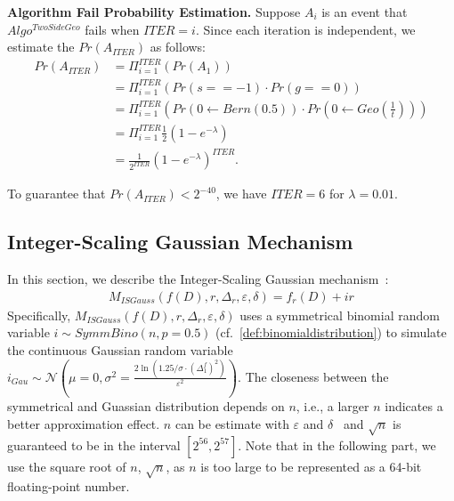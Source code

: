 \textbf{Algorithm Fail Probability Estimation. }
Suppose $A_i$ is an event that $Algo^{TwoSideGeo}$ fails when $ITER=i$.
Since each iteration is independent, we estimate the $Pr\left(A_{ITER}\right)$ as follows:
\begin{equation}
    \begin{split}
        Pr\left(A_{ITER}\right) & = \Pi _{i=1}^{ITER}\left(Pr\left(A_1\right) \right) \\
        &= \Pi _{i=1}^{ITER} \left(Pr\left(s==-1\right)\cdot  Pr\left(g==0\right) \right)\\
        &=       \Pi _{i=1}^{ITER} \left(Pr\left(0\gets Bern\left(0.5\right) \right)\cdot Pr\left(0\gets Geo\left(\frac{1}{t}\right) \right)  \right)                   \\
        &= \Pi _{i=1}^{ITER} \frac{1}{2}  \left(1-e^{-\lambda}\right) \\
        &= \frac{1}{2^{ITER}}  \left(1-e^{-\lambda}\right)^{ITER}.
    \end{split}
\end{equation}

To guarantee that $Pr\left(A_{ITER}\right)<2^{-40}$, we have $ITER = 6$ for $\lambda = 0.01$.




\subsection{Integer-Scaling Gaussian Mechanism}
\label{subsec:IntegerScalingGaussianMechanism}
In this section, we describe the Integer-Scaling Gaussian mechanism~\cite{googleDP2019}:
\begin{equation}
    \begin{split}
        M_{ISGauss}\left(f\left(D\right),r,\Delta_r,\varepsilon,\delta\right)=f_r\left(D\right) +ir
    \end{split}
\end{equation}
Specifically, $M_{ISGauss}\left(f\left(D\right),r,\Delta_r,\varepsilon,\delta\right)$ uses a symmetrical binomial random variable $i\sim SymmBino\left(n,p=0.5\right) $ (cf.~\autoref{def:binomialdistribution}) to simulate the continuous Gaussian random variable $i_{Gau}\sim \mathcal{N} \left(\mu=0,\sigma^2=\frac{2 \ln\left(1.25/\sigma \cdot \left(\Delta_1^f\right)^2 \right) }{\varepsilon^2}\right) $. The closeness between the symmetrical and Guassian distribution depends on $n$, i.e., a larger $n$ indicates a better approximation effect. $n$ can be estimate with $\varepsilon$ and $\delta$~\cite{ImproveGaussianMechanism} and $\sqrt{n} $ is guaranteed to be in the interval $\left[2^{56},2^{57}\right] $. Note that in the following part, we use the square root of $n$, $\sqrt{n}$, as $n$ is too large to be represented as a 64-bit floating-point number.

